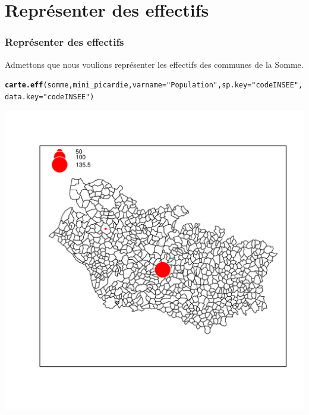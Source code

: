 \documentclass[slidetop, 10pt]{beamer}\usepackage{graphicx, color}
\makeatletter
\newcommand{\hlfunctioncall}[1]{\textcolor[rgb]{0.501960784313725,0,0.329411764705882}{\textbf{#1}}}%
\newcommand{\hlstring}[1]{\textcolor[rgb]{0.6,0.6,1}{#1}}%
\newenvironment{kframe}{%
 \def\at@end@of@kframe{}%
 \ifinner\ifhmode%
  \def\at@end@of@kframe{\end{minipage}}%
  \begin{minipage}{\columnwidth}%
 \fi\fi%
 \def\FrameCommand##1{\hskip\@totalleftmargin \hskip-\fboxsep
 \colorbox{shadecolor}{##1}\hskip-\fboxsep
     \hskip-\linewidth \hskip-\@totalleftmargin \hskip\columnwidth}%
 \MakeFramed {\advance\hsize-\width
   \@totalleftmargin\z@ \linewidth\hsize
   \@setminipage}}%
 {\par\unskip\endMakeFramed%
 \at@end@of@kframe}
\newenvironment{knitrout}{}{} %
\renewenvironment{knitrout}{\begin{tiny}}{\end{tiny}}
\makeatother
\begin{document}
\section{Représenter des effectifs}
\begin{frame}
\frametitle{Représenter des effectifs}

Admettons que nous voulions représenter les effectifs des communes de la Somme. 


\begin{knitrout}\tiny
{}\color{fgcolor}\begin{kframe}
\begin{alltt}
\hlfunctioncall{carte.eff}(somme, mini_picardie, varname = \hlstring{"Population"}, sp.key = \hlstring{"codeINSEE"}, 
    data.key = \hlstring{"codeINSEE"})
\end{alltt}
\end{kframe}

{\centering \includegraphics[width=.55\linewidth]{images/carteeff} 

}


\end{knitrout}


\end{frame}
\end{document}
